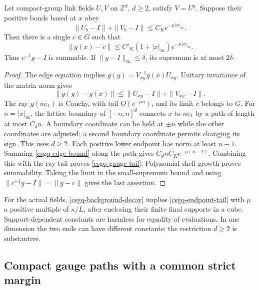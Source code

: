 \begin{lemma}
\label{csgq-constant-lemma}
Let compact-group link fields $U,V$ on $\mathbb Z^d$, $d\ge2$, satisfy
$V=U^g$. Suppose their positive bonds based at $x$ obey
\begin{equation}
       \|U_b-I\|+\|V_b-I\|\le C_K e^{-\mu|x|_\infty}.
 \label{csgq-endpoint-tail}
\end{equation}
Then there is a single $c\in G$ such that
\begin{equation}
 \|g(x)-c\|\le C'_K(1+|x|_\infty)e^{-\mu|x|_\infty}.
 \label{csgq-gauge-tail}
\end{equation}
Thus $c^{-1}g-I$ is summable. If $\|g-I\|_\infty\le\delta$, its
supremum is at most $2\delta$.
\end{lemma}
\begin{proof}
The edge equation implies $g(y)=V_{xy}^{-1}g(x)U_{xy}$.
Unitary invariance of the matrix norm gives
\begin{equation}
       \|g(y)-g(x)\|\le\|U_{xy}-I\|+\|V_{xy}-I\|.
 \label{csgq-edge-bound}
\end{equation}
The ray $g(ne_1)$ is Cauchy, with tail $O(e^{-\mu n})$, and
its limit $c$ belongs to $G$. For $n=|x|_\infty$, the lattice boundary
of $[-n,n]^d$ connects $x$ to $ne_1$ by a path of length at most
$C_dn$. A boundary coordinate can be held at $\pm n$ while the other
coordinates are adjusted; a second boundary coordinate permits changing
its sign. This uses $d\ge2$. Each positive lower endpoint has norm at
least $n-1$. Summing \eqref{csgq-edge-bound} along the path gives
$C_dnC_Ke^{-\mu(n-1)}$. Combining this with the ray tail proves
\eqref{csgq-gauge-tail}. Polynomial shell growth proves summability.
Taking the limit in the small-supremum bound and using
$\|c^{-1}g-I\|=\|g-c\|$ gives the last assertion.
\end{proof}

For the actual fields, \eqref{csgq-background-decay} implies
\eqref{csgq-endpoint-tail} with $\mu$ a positive multiple of
$\kappa/L$, after enclosing their finite final supports in a cube.
Support-dependent constants are harmless for equality of evaluations.
In one dimension the two ends can have different constants; the
restriction $d\ge2$ is substantive.

\subsection{Compact gauge paths with a common strict margin}
\label{csgq-path-section}

